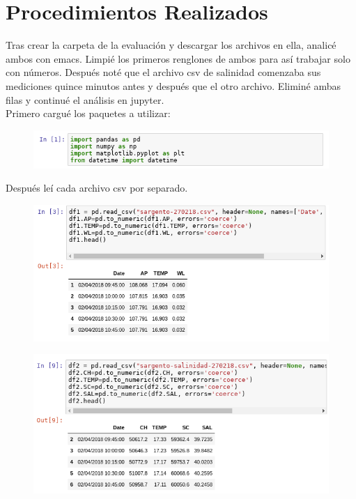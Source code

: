 \documentclass{article}
\begin{document}
\section{Procedimientos Realizados}
Tras crear la carpeta de la evaluación y descargar los archivos en ella, analicé ambos con emacs. Limpié los primeros renglones de ambos para así trabajar solo con números. Después noté que el archivo csv de salinidad comenzaba sus mediciones quince minutos antes y después que el otro archivo. Eliminé ambas filas y continué el análisis en jupyter.\\
Primero cargué los paquetes a utilizar:\\
\begin{figure}[H]
	\centering
    \includegraphics[width=\linewidth]{carga.png}\\
\end{figure}
Después leí cada archivo csv por separado.\\
\begin{figure}[H]
	\centering
    \includegraphics[width=\linewidth]{leer1.png}\\
\end{figure}
\begin{figure}[H]
	\centering
    \includegraphics[width=\linewidth]{leer2.png}\\
\end{figure}
\end{document}
